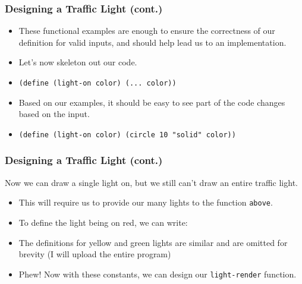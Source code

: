 \documentclass{beamer}
\begin{document}

\begin{frame}
  \frametitle{Designing a Traffic Light (cont.)}
  \lightOnExamples
  \begin{itemize}
  \item<2->These functional examples are enough to ensure the
    correctness of our definition for valid inputs, and should
    help lead us to an implementation.
  \item<3-> Let's now skeleton out our code.
  \item<4-> \texttt{(define (light-on color) (... color))}
  \item<5-> Based on our examples, it should be easy to see part of
    the code changes based on the input.
  \item<6-> \texttt{(define (light-on color) (circle 10 "solid" color))}
  \end{itemize}
\end{frame}


\begin{frame}
  \frametitle{Designing a Traffic Light (cont.)}
  Now we can draw a single light on, but we still can't draw an entire
  traffic light. 
  \begin{itemize}
  \item<2-> This will require us to provide our many lights to
    the function \texttt{above}.
  \item<3-> To define the light being on red, we can write:
    \redLight
  \item<4-> The definitions for yellow and green lights are similar
    and are omitted for brevity (I will upload the entire program)
  \item<5-> Phew! Now with these constants, we can design our
    \texttt{light-render} function.
  \end{itemize}
\end{frame}
\end{document}
